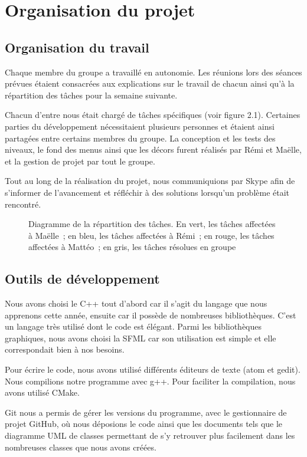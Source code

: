 \chapter{Organisation du projet}

\section{Organisation du travail}

Chaque membre du groupe a travaillé en autonomie. Les réunions lors des séances
prévues étaient consacrées aux explications sur le travail de chacun ainsi qu'à
la répartition des tâches pour la semaine suivante.

Chacun d'entre nous était chargé de tâches spécifiques (voir figure 2.1).
Certaines parties du développement nécessitaient plusieurs personnes et
étaient ainsi partagées entre certains membres du groupe. La conception
et les tests des niveaux, le fond des menus ainsi que les décors furent
réalisés par Rémi et Maëlle, et la gestion de projet par tout le groupe.

Tout au long de la réalisation du projet, nous communiquions par Skype
afin de s'informer de l'avancement et réfléchir à des solutions lorsqu'un
problème était rencontré.

\begin{figure}[p!]
    \centering
    
    \caption{
        Diagramme de la répartition des tâches. En vert, les tâches
        affectées à Maëlle~; en bleu, les tâches affectées à Rémi~;
        en rouge, les tâches affectées à Mattéo~; en gris, les
        tâches résolues en groupe
    }
    \label{fig:organisation-gantt}
\end{figure}
\restoregeometry

\section{Outils de développement}

Nous avons choisi le C++ tout d'abord car il s'agit du langage que nous
apprenons cette année, ensuite car il possède de nombreuses bibliothèques.
C'est un langage très utilisé dont le code est élégant. Parmi les bibliothèques
graphiques, nous avons choisi la SFML car son utilisation est simple et
elle correspondait bien à nos besoins.

Pour écrire le code, nous avons utilisé différents éditeurs de texte
(atom et gedit). Nous compilions notre programme avec g++. Pour faciliter
la compilation, nous avons utilisé CMake.

Git nous a permis de gérer les versions du programme, avec le gestionnaire
de projet GitHub, où nous déposions le code ainsi que les documents tels
que le diagramme UML de classes permettant de s'y retrouver plus facilement
dans les nombreuses classes que nous avons créées.
